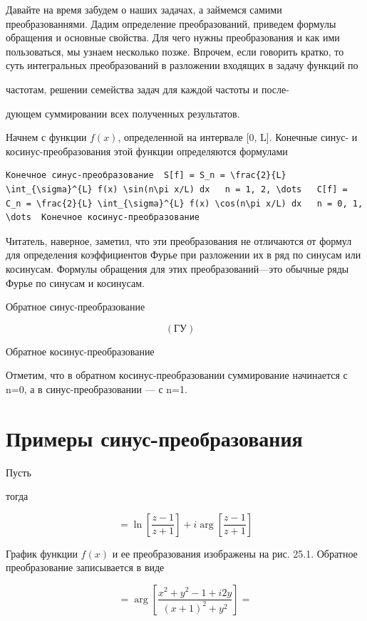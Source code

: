 \documentclass[
  ukrainian,
]{article}
\begin{document}
Давайте на время забудем о наших задачах, а займемся самими
преобразованнями. Дадим определение преобразований, приведем формулы
обращения и основные свойства. Для чего нужны преобразования и как ими
пользоваться, мы узнаем несколько позже. Впрочем, если говорить кратко,
то суть интегральных преобразований в разложении входящих в задачу
функций по

частотам, решении семейства задач для каждой частоты и после-

дующем суммировании всех полученных результатов.

Начнем с функции \(f(x)\), определенной на интервале {[}0, L{]}.
Конечные синус- и косинус-преобразования этой функции определяются
формулами

\begin{verbatim}
Конечное синус-преобразование  S[f] = S_n = \frac{2}{L} \int_{\sigma}^{L} f(x) \sin(n\pi x/L) dx   n = 1, 2, \dots   C[f] = C_n = \frac{2}{L} \int_{\sigma}^{L} f(x) \cos(n\pi x/L) dx   n = 0, 1, \dots  Конечное косинус-преобразование
\end{verbatim}

Читатель, наверное, заметил, что эти преобразования не отличаются от
формул для определения коэффициентов Фурье при разложении их в ряд по
синусам или косинусам. Формулы обращения для этих преобразований---это
обычные ряды Фурье по синусам и косинусам.

Обратное синус-преобразование

\[
(\text{ГУ}) \quad
\]

Обратное косинус-преобразование

Отметим, что в обратном косинус-преобразовании суммирование начинается с
n=0, а в синус-преобразовании --- с n=1.

\section{Примеры
синус-преобразования}\label{ux43fux440ux438ux43cux435ux440ux44b-ux441ux438ux43dux443ux441-ux43fux440ux435ux43eux431ux440ux430ux437ux43eux432ux430ux43dux438ux44f}

Пусть

тогда

\[
= \ln\left[\frac{z-1}{z+1}\right] + i \arg\left[\frac{z-1}{z+1}\right]
\]

График функции \(f(x)\) и ее преобразования изображены на рис. 25.1.
Обратное преобразование записывается в виде

\[
= \arg\left[\frac{x^2+y^2-1+i2y}{(x+1)^2+y^2}\right] =
\]
\end{document}
